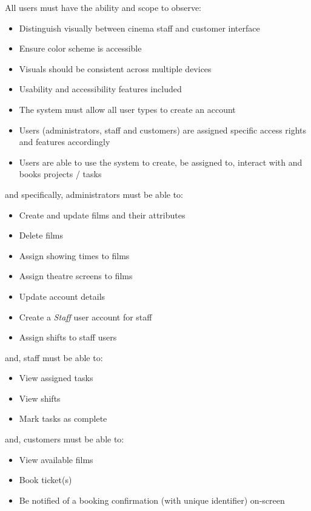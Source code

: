 \documentclass[11pt, english]{article}
\begin{document}
	All users must have the ability and scope to observe:

	\begin{itemize}
        \setlength\itemsep{0cm}
		\item Distinguish visually between cinema staff and customer interface
		\item Ensure color scheme is accessible
		\item Visuals should be consistent across multiple devices
		\item Usability and accessibility features included
		\item The system must allow all user types to create an account
		\item Users (administrators, staff and customers) are assigned specific access rights and features accordingly
		\item Users are able to use the system to create, be assigned to, interact with and books projects / tasks
	\end{itemize}

	and specifically, administrators must be able to:

	\begin{itemize}
        \setlength\itemsep{0cm}
		\item Create and update films and their attributes
		\item Delete films
		\item Assign showing times to films
		\item Assign theatre screens to films
		\item Update account details
		\item Create a \textit{Staff} user account for staff
		\item Assign shifts to staff users
	\end{itemize}

	and, staff must be able to:

	\begin{itemize}
        \setlength\itemsep{0cm}
		\item View assigned tasks
		\item View shifts
		\item Mark tasks as complete
	\end{itemize}

	and, customers must be able to:

	\begin{itemize}
        \setlength\itemsep{0cm}
		\item View available films
		\item Book ticket(s)
		\item Be notified of a booking confirmation (with unique identifier) on-screen
	\end{itemize}
\end{document}
